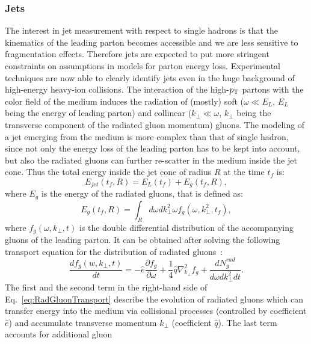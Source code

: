 \subsubsection{Jets}
\label{sec:Jets}
The interest in jet measurement with respect to single hadrons is that
the kinematics of the leading parton becomes accessible and we are 
less sensitive to fragmentation effects. Therefore jets are expected to put 
more stringent constraints on assumptions in models for parton energy loss. 
Experimental techniques are now able to clearly identify jets 
even in the huge background of high-energy heavy-ion collisions. 
The interaction of the high-$p_{\rm T}$ partons with the color field of the medium
 induces the radiation of (mostly) soft ($\omega \ll E_{L}$, $E_L$ being the 
 energy of leading parton) and collinear ($k_{\perp} \ll \omega$, $k_{\perp}$ being
 the transverse component of the radiated gluon momentum) gluons. The 
 modeling of a jet emerging from the medium is more complex than that of
  single hadron, since not only the energy loss of the leading parton has to be 
  kept into account, but also the radiated gluons can further re-scatter in the 
  medium inside the jet cone. Thus the total energy inside the jet cone 
  of radius $R$ at the time $t_f$ is:
\begin{equation}
\label{eq:EnergyJet}
E_{jet}(t_f,R) = E_L(t_f) +E_g(t_f,R),
\end{equation}
where $E_g$ is the energy of the radiated gluons, that is defined as:
\begin{equation}
\label{eq:Eg}
E_g(t_f,R) = \int_R d\omega dk^2_\perp \omega f_g(\omega,k^2_\perp,t_f),
\end{equation}
where $f_g(\omega,k_{\perp},t)$ is the double differential distribution of 
the accompanying gluons of the leading parton. It can be obtained after solving 
the following transport equation for the distribution of radiated gluons~\cite{Qin:2015srf}:
\begin{equation}
\label{eq:RadGluonTransport}
\frac{df_g(w,k_{\perp},t)}{dt} = -\hat{e}\frac{\partial f_g}{\partial \omega} + \frac{1}{4}\hat{q}\nabla^2_{k_{\perp}}f_g + \frac{dN^{rad}_g}{d\omega dk^2_{\perp} dt}.
\end{equation}
The first and the second term in the right-hand side of Eq.~\ref{eq:RadGluonTransport} 
describe the evolution of radiated gluons which can transfer energy 
into the medium via collisional processes (controlled by coefficient 
$\hat{e}$) and accumulate transverse momentum $k_\perp$ 
(coefficient $\hat{q}$). The last term accounts for additional gluon 
